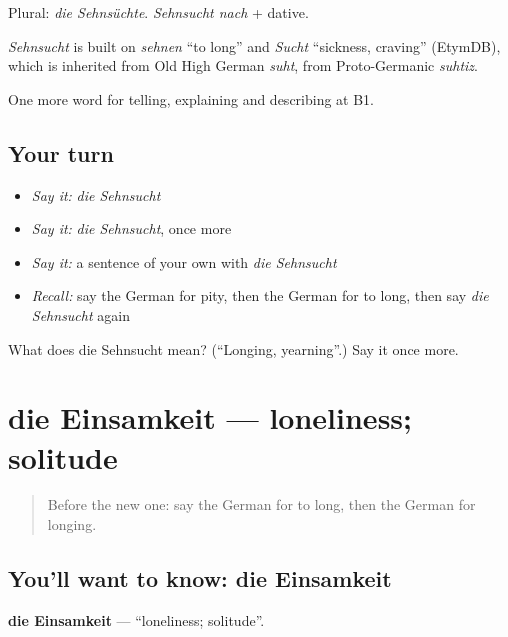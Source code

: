 Plural: \emph{die Sehnsüchte}. \emph{Sehnsucht nach} + dative.

\begin{cousinweb}
\emph{Sehnsucht} is built on \emph{sehnen} \textquotedblleft{}to long\textquotedblright{} and \emph{Sucht} \textquotedblleft{}sickness, craving\textquotedblright{} (EtymDB), which is inherited from Old High German \emph{suht}, from Proto-Germanic \emph{suhtiz}.
\end{cousinweb}

\begin{grammarlens}[title={What you've built}]
One more word for telling, explaining and describing at B1.
\end{grammarlens}

\subsection*{Your turn}
\begin{itemize}
\raggedright
  \item \emph{Say it:} \emph{die Sehnsucht}
  \item \emph{Say it:} \emph{die Sehnsucht}, once more
  \item \emph{Say it:} a sentence of your own with \emph{die Sehnsucht}
  \item \emph{Recall:} say the German for pity, then the German for to long, then say \emph{die Sehnsucht} again
\end{itemize}

\begin{tcolorbox}[breakable,colback=teal!4,colframe=teal!35!black,title={Before you move on}]
What does die Sehnsucht mean? (\textquotedblleft{}Longing, yearning\textquotedblright{}.) Say it once more.
\end{tcolorbox}
\section[die Einsamkeit]{die Einsamkeit — loneliness; solitude}

\label{lesson:GE-C472-einsamkeit}



\begin{quote}
Before the new one: say the German for to long, then the German for longing.
\end{quote}

\subsection*{You'll want to know: die Einsamkeit}
\textbf{die Einsamkeit} — \textquotedblleft{}loneliness; solitude\textquotedblright{}.

